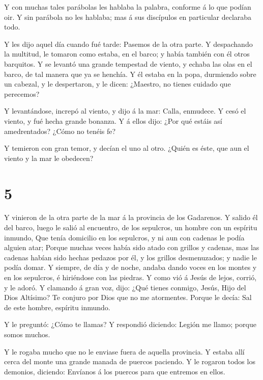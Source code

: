  Y con muchas tales parábolas les hablaba la palabra,
conforme á lo que podían oir.  Y sin parábola no les
hablaba; mas á sus discípulos en particular declaraba todo.

 Y les dijo aquel día cuando fué tarde: Pasemos de la otra
parte.  Y despachando la multitud, le tomaron como estaba,
en el barco; y había también con él otros barquitos.  Y se
levantó una grande tempestad de viento, y echaba las olas en el barco,
de tal manera que ya se henchía.  Y él estaba en la popa,
durmiendo sobre un cabezal, y le despertaron, y le dicen: ¿Maestro, no
tienes cuidado que perecemos?

 Y levantándose, increpó al viento, y dijo á la mar: Calla,
enmudece. Y cesó el viento, y fué hecha grande bonanza.  Y
á ellos dijo: ¿Por qué estáis así amedrentados? ¿Cómo no tenéis fe?

 Y temieron con gran temor, y decían el uno al otro. ¿Quién
es éste, que aun el viento y la mar le obedecen?

\hypertarget{section-4}{%
\section{5}\label{section-4}}

 Y vinieron de la otra parte de la mar á la provincia de los
Gadarenos.  Y salido él del barco, luego le salió al
encuentro, de los sepulcros, un hombre con un espíritu inmundo,
 Que tenía domicilio en los sepulcros, y ni aun con cadenas
le podía alguien atar;  Porque muchas veces había sido atado
con grillos y cadenas, mas las cadenas habían sido hechas pedazos por
él, y los grillos desmenuzados; y nadie le podía domar.  Y
siempre, de día y de noche, andaba dando voces en los montes y en los
sepulcros, é hiriéndose con las piedras.  Y como vió á Jesús
de lejos, corrió, y le adoró.  Y clamando á gran voz, dijo:
¿Qué tienes conmigo, Jesús, Hijo del Dios Altísimo? Te conjuro por Dios
que no me atormentes.  Porque le decía: Sal de este hombre,
espíritu inmundo.

 Y le preguntó: ¿Cómo te llamas? Y respondió diciendo:
Legión me llamo; porque somos muchos.

 Y le rogaba mucho que no le enviase fuera de aquella
provincia.  Y estaba allí cerca del monte una grande manada
de puercos paciendo.  Y le rogaron todos los demonios,
diciendo: Envíanos á los puercos para que entremos en ellos.

